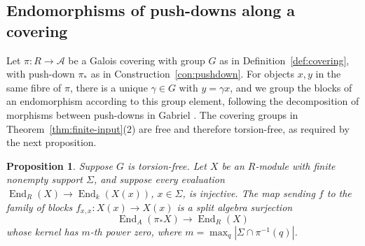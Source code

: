 \documentclass[a4paper,reqno,10pt]{amsart}
\newtheorem{proposition}[theorem]{Proposition}
\theoremstyle{definition}
\DeclareMathOperator{\End}{End}
\numberwithin{equation}{section}
\begin{document}
\subsection{Endomorphisms of push-downs along a covering}
Let $\pi:R\to\mathcal A$ be a Galois covering with group $G$ as in
Definition~\ref{def:covering}, with push-down $\pi_*$ as in
Construction~\ref{con:pushdown}.
For objects $x,y$ in the same fibre of $\pi$, there is a
unique $\gamma\in G$ with $y=\gamma x$, and we group the blocks of an endomorphism according to this
group element, following the decomposition of morphisms between push-downs
in Gabriel \cite[\S3.2 and proof of Theorem~3.6(c)]{GabrielUniversal}.
The covering groups in Theorem~\ref{thm:finite-input}(2) are free and therefore
torsion-free, as required by the next proposition.

\begin{proposition}\label{prop:cover-end}
Suppose $G$ is torsion-free. Let $X$ be an $R$-module
with finite nonempty support $\Sigma$, and suppose every evaluation
$\End_R(X)\to\End_k(X(x))$, $x\in\Sigma$, is injective.
The map sending $f$ to the family of blocks $f_{x,x}:X(x)\to X(x)$
is a split algebra surjection
\[
 \End_A(\pi_*X)\longrightarrow\End_R(X)
\]
whose kernel has $m$-th power zero, where
$m=\max_q|\Sigma\cap\pi^{-1}(q)|$.
\end{proposition}
\end{document}

